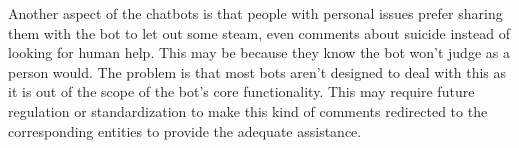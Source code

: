 Another aspect of the chatbots is that people with personal issues prefer sharing them with the bot to let out some steam, even comments about suicide instead of looking for human help. This may be because they know the bot won’t judge as a person would. The problem is that most bots aren’t designed to deal with this as it is out of the scope of the bot’s core functionality. This may require future regulation or standardization to make this kind of comments redirected to the corresponding entities to provide the adequate assistance.\cite{eth-bot}\\
